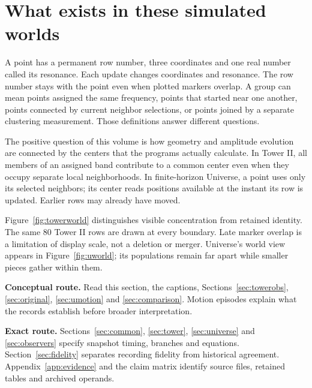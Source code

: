 \documentclass[11pt,a4paper]{article}
\begin{document}
\section{What exists in these simulated worlds}\label{sec:orientation}
A point has a permanent row number, three coordinates and one real number called its resonance. Each update changes coordinates and resonance. The row number stays with the point even when plotted markers overlap. A group can mean points assigned the same frequency, points that started near one another, points connected by current neighbor selections, or points joined by a separate clustering measurement. Those definitions answer different questions.

The positive question of this volume is how geometry and amplitude evolution are connected by the centers that the programs actually calculate. In Tower II, all members of an assigned band contribute to a common center even when they occupy separate local neighborhoods. In finite-horizon Universe, a point uses only its selected neighbors; its center reads positions available at the instant its row is updated. Earlier rows may already have moved.

Figure~\ref{fig:towerworld} distinguishes visible concentration from retained identity. The same 80 Tower II rows are drawn at every boundary. Late marker overlap is a limitation of display scale, not a deletion or merger. Universe's world view appears in Figure~\ref{fig:uworld}; its populations remain far apart while smaller pieces gather within them.

\textbf{Conceptual route.} Read this section, the captions, Sections~\ref{sec:towerobs}, \ref{sec:original}, \ref{sec:umotion} and \ref{sec:comparison}. Motion episodes explain what the records establish before broader interpretation.

\textbf{Exact route.} Sections~\ref{sec:common}, \ref{sec:tower}, \ref{sec:universe} and \ref{sec:observers} specify snapshot timing, branches and equations. Section~\ref{sec:fidelity} separates recording fidelity from historical agreement. Appendix~\ref{app:evidence} and the claim matrix identify source files, retained tables and archived operands.
\end{document}
